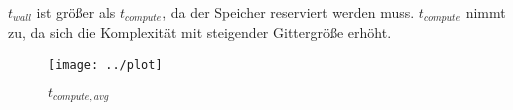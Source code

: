 \documentclass[12pt]{article}
\begin{document}
$t_{wall}$ ist größer als $t_{compute}$, da der Speicher reserviert werden muss.
$t_{compute}$ nimmt zu, da sich die Komplexität mit steigender Gittergröße erhöht.

\begin{figure}[ht]
	\centering
	\texttt{[image: ../plot]}
	\caption[$t_{compute,avg}$]{$t_{compute,avg}$}
	\label{fig:plot}
\end{figure}
\end{document}
